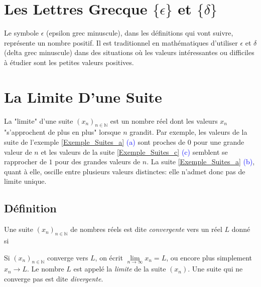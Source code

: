 \documentclass[oneside,11pt,french,table]{book}
\theoremstyle{definition}
\theoremstyle{plain}
\theoremstyle{remark}
\begin{document}
\section{Les Lettres Grecque $\{\epsilon\}$ et $\{\delta\}$}
 Le symbole $\epsilon$ (epsilon grec minuscule), dans les définitions qui vont suivre, représente un nombre positif. Il est traditionnel en mathématiques d'utiliser $\epsilon$ et $\delta$ (delta grec minuscule) dans des situations où les valeurs intéressantes ou difficiles à étudier sont les petites valeurs positives. \\
\section{La Limite D'une Suite}
La "limite" d'une suite $(x_n)_{n\in \mathbb{N}}$ est un nombre réel dont les valeurs $x_n$ "s'approchent de plus en plus" lorsque $n$ grandit. Par exemple, les valeurs de la suite de l'exemple \textcolor{blue}{\ref{Exemple_Suites_a}} \textcolor{blue}{(a)} sont proches de $0$ pour une grande valeur de $n$ et les valeurs de la suite \textcolor{blue}{\ref{Exemple_Suites_c}} \textcolor{blue}{(c)} semblent se rapprocher de $1$ pour des grandes valeurs de $n$. La suite \textcolor{blue}{\ref{Exemple_Suites_a}} \textcolor{blue}{(b)}, quant à elle, oscille entre plusieurs valeurs distinctes: elle n'admet donc pas de limite unique.

\subsection{Définition}\label{definition_suite_convergence}
Une suite $(x_n)_{n\in \mathbb{N}}$ de nombres réels est dite \textit{convergente} vers un réel $L$ donné si \begin{center}
\end{center}
Si $(x_n)_{n\in \mathbb{N}}$ converge vers $L$, on écrit $\lim\limits_{n\to \infty}{x_n}=L$, ou encore plus simplement $x_n \to L$. Le nombre $L$ est appelé la \textit{limite} de la suite $(x_n)$. Une suite qui ne converge pas est dite \textit{divergente}.
\end{document}
